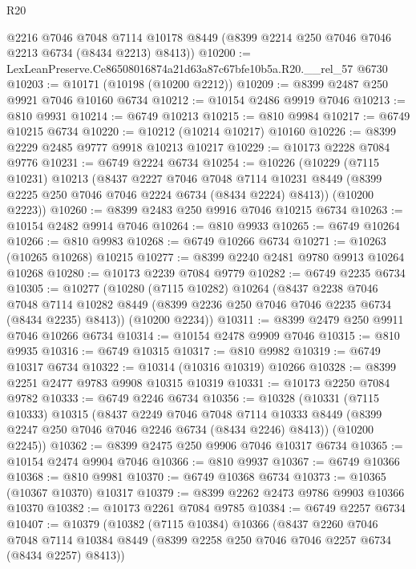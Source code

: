 \begin{lexlean}{R20}
\begin{coremodule}
{      @2216
      @7046
      @7048
      @7114
      @10178
      @8449
      (@8399 @2214 @250 @7046 @7046 @2213 @6734 (@8434 @2213) @8413))
@10200 := LexLeanPreserve.Ce86508016874a21d63a87c67bfe10b5a.R20.__rel_57 @6730
@10203 := @10171 (@10198 (@10200 @2212))
@10209 := @8399 @2487 @250 @9921 @7046 @10160 @6734
@10212 := @10154 @2486 @9919 @7046
@10213 := @810 @9931
@10214 := @6749 @10213
@10215 := @810 @9984
@10217 := @6749 @10215 @6734
@10220 := @10212 (@10214 @10217) @10160
@10226 := @8399 @2229 @2485 @9777 @9918 @10213 @10217
@10229 := @10173 @2228 @7084 @9776
@10231 := @6749 @2224 @6734
@10254 := @10226
    (@10229
      (@7115 @10231)
      @10213
      (@8437
        @2227
        @7046
        @7048
        @7114
        @10231
        @8449
        (@8399 @2225 @250 @7046 @7046 @2224 @6734 (@8434 @2224) @8413))
      (@10200 @2223))
@10260 := @8399 @2483 @250 @9916 @7046 @10215 @6734
@10263 := @10154 @2482 @9914 @7046
@10264 := @810 @9933
@10265 := @6749 @10264
@10266 := @810 @9983
@10268 := @6749 @10266 @6734
@10271 := @10263 (@10265 @10268) @10215
@10277 := @8399 @2240 @2481 @9780 @9913 @10264 @10268
@10280 := @10173 @2239 @7084 @9779
@10282 := @6749 @2235 @6734
@10305 := @10277
    (@10280
      (@7115 @10282)
      @10264
      (@8437
        @2238
        @7046
        @7048
        @7114
        @10282
        @8449
        (@8399 @2236 @250 @7046 @7046 @2235 @6734 (@8434 @2235) @8413))
      (@10200 @2234))
@10311 := @8399 @2479 @250 @9911 @7046 @10266 @6734
@10314 := @10154 @2478 @9909 @7046
@10315 := @810 @9935
@10316 := @6749 @10315
@10317 := @810 @9982
@10319 := @6749 @10317 @6734
@10322 := @10314 (@10316 @10319) @10266
@10328 := @8399 @2251 @2477 @9783 @9908 @10315 @10319
@10331 := @10173 @2250 @7084 @9782
@10333 := @6749 @2246 @6734
@10356 := @10328
    (@10331
      (@7115 @10333)
      @10315
      (@8437
        @2249
        @7046
        @7048
        @7114
        @10333
        @8449
        (@8399 @2247 @250 @7046 @7046 @2246 @6734 (@8434 @2246) @8413))
      (@10200 @2245))
@10362 := @8399 @2475 @250 @9906 @7046 @10317 @6734
@10365 := @10154 @2474 @9904 @7046
@10366 := @810 @9937
@10367 := @6749 @10366
@10368 := @810 @9981
@10370 := @6749 @10368 @6734
@10373 := @10365 (@10367 @10370) @10317
@10379 := @8399 @2262 @2473 @9786 @9903 @10366 @10370
@10382 := @10173 @2261 @7084 @9785
@10384 := @6749 @2257 @6734
@10407 := @10379
    (@10382
      (@7115 @10384)
      @10366
      (@8437
        @2260
        @7046
        @7048
        @7114
        @10384
        @8449
        (@8399 @2258 @250 @7046 @7046 @2257 @6734 (@8434 @2257) @8413))
}
\end{coremodule}
\end{lexlean}
